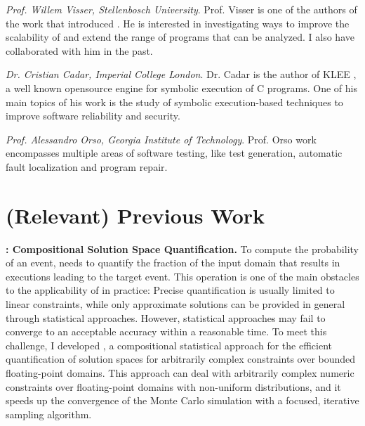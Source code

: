 \documentclass[10pt]{article}
\newcounter{list}
\begin{document}
  \textit{Prof. Willem Visser, Stellenbosch University}.
  Prof. Visser is one of the authors of the work that introduced \PSE{}
  \cite{geldenhuys2012probabilistic}. He is interested in
  investigating ways to improve the scalability of \PSE{} and extend
  the range of programs that can be analyzed. I also have collaborated
  with him in the past.

  \textit{Dr. Cristian Cadar, Imperial College
    London}. Dr. Cadar is the author of KLEE \cite{cadar2008klee}, a
  well known opensource engine for symbolic execution of C programs.
  One of his main topics of his work is the study of symbolic
  execution-based techniques to improve software reliability and
  security.
    
  \textit{Prof. Alessandro Orso, Georgia Institute of
    Technology}. Prof. Orso work encompasses multiple areas of software
  testing, like test generation, automatic fault localization and
  program repair.
  

\section{(Relevant) Previous Work}

\textbf{\qCORAL{}: Compositional Solution Space Quantification.} To
compute the probability of an event, \PSE{} needs to quantify the
fraction of the input domain that results in executions leading to the
target event. This operation is one of the main obstacles to the
applicability of \PSE{} in practice: Precise quantification is usually
limited to linear constraints, while only approximate solutions can be
provided in general through statistical approaches. However,
statistical approaches may fail to converge to an acceptable accuracy
within a reasonable time. To meet this challenge, I developed
\qCORAL\cite{borges2014compositional,borges2015iterative}, a
compositional statistical approach for the efficient quantification of
solution spaces for arbitrarily complex constraints over bounded
floating-point domains. This approach can deal with arbitrarily
complex numeric constraints over floating-point domains with
non-uniform distributions, and it speeds up the convergence of the
Monte Carlo simulation with a focused, iterative sampling algorithm.



\end{document}

